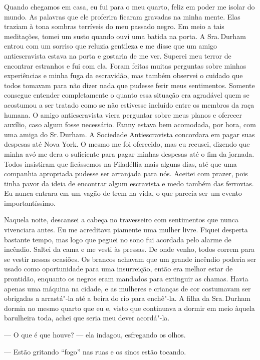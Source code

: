 Quando chegamos em casa, eu fui para o
meu quarto, feliz em poder me isolar do mundo. As palavras que ele
proferira ficaram gravadas na minha mente. Elas traziam à tona sombras
terríveis do meu passado negro. Em meio a tais meditações, tomei um
susto quando ouvi uma batida na porta. A Sra.\,Durham entrou com um
sorriso que reluzia gentileza e me disse que um amigo antiescravista
estava na porta e gostaria de me ver. Superei meu terror de encontrar
estranhos e fui com ela. Foram feitas muitas perguntas sobre minhas
experiências e minha fuga da escravidão, mas também observei o cuidado
que todos tomavam para não dizer nada que pudesse ferir meus
sentimentos. Somente consegue entender completamente o quanto essa
situação era agradável quem se acostumou a ser tratado como se não
estivesse incluído entre os membros da raça humana. O amigo
antiescravista viera perguntar sobre meus planos e oferecer auxílio,
caso algum fosse necessário. Fanny estava bem acomodada, por hora, com
uma amiga do Sr.\,Durham. A Sociedade Antiescravista concordara em pagar
suas despesas até Nova York. O mesmo me foi oferecido, mas eu recusei,
dizendo que minha avó me dera o suficiente para pagar minhas despesas
até o fim da jornada. Todos insistiram que ficássemos na Filadélfia mais
alguns dias, até que uma companhia apropriada pudesse ser arranjada para
nós. Aceitei com prazer, pois tinha pavor da ideia de encontrar algum
escravista e medo também das ferrovias. Eu nunca entrara em um vagão de
trem na vida, o que parecia ser um evento importantíssimo.

Naquela noite, descansei a cabeça no
travesseiro com sentimentos que nunca vivenciara antes. Eu me acreditava
piamente uma mulher livre. Fiquei desperta bastante tempo, mas logo que
peguei no sono fui acordada pelo alarme de incêndio. Saltei da cama e me
vesti às pressas. De onde venho, todos correm para se vestir nessas
ocasiões. Os brancos achavam que um grande incêndio poderia ser usado
como oportunidade para uma insurreição, então era melhor estar de
prontidão, enquanto os negros eram mandados para extinguir as chamas.
Havia apenas uma máquina na cidade, e as mulheres e crianças de cor
costumavam ser obrigadas a arrastá"-la até a beira do rio para enchê"-la.
A filha da Sra.\,Durham dormia no mesmo quarto que eu e, visto que
continuava a dormir em meio àquela barulheira toda, achei que seria meu
dever acordá"-la.

--- O que é que houve? --- ela indagou, esfregando os olhos.

--- Estão gritando ``fogo'' nas ruas e
os sinos estão tocando.

